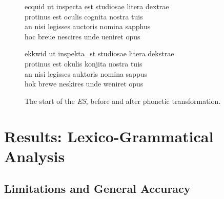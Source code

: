 \documentclass[twocolumn, switch, a4paper]{article} %
\begin{document}
\begin{figure}
\caption{The start of the \emph{ES}, before and after phonetic transformation.}
\label{fig:phon_trans}
\begin{adjustwidth}{0.07\linewidth}{0.07\linewidth}
ecquid ut inspecta est studiosae litera dextrae\\
\phantom{xx}protinus est oculis cognita nostra tuis\\
an nisi legisses auctoris nomina sapphus\\
\phantom{xx}hoc breue nescires unde ueniret opus\\
\smallskip

ekkwid ut inspekta\_st studiosae litera dekstrae\\
\phantom{xx}protinus est okulis konjita nostra tuis\\
an nisi legisses auktoris nomina sappus\\
\phantom{xx}hok brewe neskires unde weniret opus\\
\end{adjustwidth}
\end{figure}

\section{Results: Lexico-Grammatical Analysis}
\label{sec: lsa}

\subsection{Limitations and General Accuracy}
\label{sec: ngram_acc}
\end{document}
